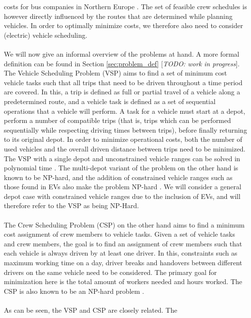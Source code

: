\documentclass[]{article}
\newcommand{\todo}[1]{{\color{red}[\textit{TODO: #1}]}}
\begin{document}
costs for bus companies in Northern Europe \cite{Perumal2019Crew}. The set of
feasible crew schedules is however directly influenced by the routes that are
determined while planning vehicles. In order to optimally minimize costs, we therefore also need to consider (electric) vehicle scheduling.
\\\\ We will now give an informal overview of the
problems at hand. A more formal definition can be found in Section
\ref{sec:problem_def} \todo{work in progress}. \\
The Vehicle Scheduling Problem (VSP) aims to find a set
of minimum cost vehicle tasks such that all trips that need to be driven
throughout a time period are covered. In this, a trip is defined as full or
partial travel of a vehicle along a predetermined route, and a vehicle task is
defined as a set of sequential operations that a vehicle will perform. A task for a
vehicle must start at a depot, perform a number of compatible trips (that is,
trips which can be performed sequentially while respecting driving times
between trips), before finally returning to its original depot. In order to
minimize operational costs, both the number of used vehicles and the overall driven
distance between trips need to be minimized. \\ The VSP
with a single depot and unconstrained vehicle ranges can be solved in
polynomial time \cite{Freling2003SDVSP}. The multi-depot variant of the problem
on the other hand is known to be NP-hard, and the addition of constrained vehicle ranges such as those found
in EVs also make the problem NP-hard \cite{Bodin1983}. We will consider a
general depot case with constrained vehicle ranges due to the inclusion of EVs,
and will therefore refer to the VSP as being NP-Hard. \\\\ The Crew
Scheduling Problem (CSP) on the other hand aims to find a minimum cost
assignment of crew members to vehicle tasks. Given a set of vehicle tasks and
crew members, the goal is to find an assignment of crew members such that each
vehicle is always driven by at least one driver. In this, constraints such as
maximum working time on a day, driver breaks and handovers between different
drivers on the same vehicle need to be considered. The primary goal for
minimization here is the total amount of workers needed and hours worked. The
CSP is also known to be an NP-hard problem \cite{Fischetti1989}.\\\\ As can be seen, the VSP and CSP are closely related. The
\end{document}
